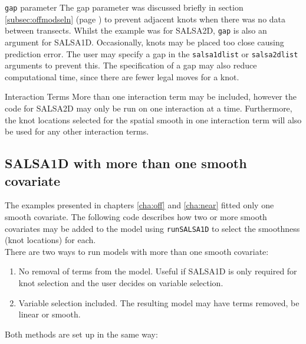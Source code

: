 \begin{block}{{\tt gap} parameter}
The gap parameter was discussed briefly in section \ref{subsec:offmodseln} (page \pageref{gappage}) to prevent adjacent knots when there was no data between transects.  Whilst the example was for SALSA2D, {\tt gap} is also an argument for SALSA1D.  Occasionally, knots may be placed too close causing prediction error.  The user may specify a gap in the {\tt salsa1dlist} or {\tt salsa2dlist} arguments to prevent this.  The specification of a gap may also reduce computational time, since there are fewer legal moves for a knot.
\end{block}

\begin{block}{Interaction Terms}
More than one interaction term may be included, however the code for SALSA2D may only be run on one interaction at a time.  Furthermore, the knot locations selected for the spatial smooth in one interaction term will also be used for any other interaction terms.
\end{block}
\subsection{SALSA1D with more than one smooth covariate}

The examples presented in chapters \ref{cha:off} and \ref{cha:near} fitted only one smooth covariate.  The following code describes how two or more smooth covariates may be added to the model using {\tt runSALSA1D} to select the smoothness (knot locations) for each.\\

\noindent There are two ways to run models with more than one smooth covariate:

\begin{enumerate}
\item No removal of terms from the model.  Useful if SALSA1D is only required for knot selection and the user decides on variable selection.
\item Variable selection included.  The resulting model may have terms removed, be linear or smooth.
\end{enumerate}

\noindent Both methods are set up in the same way:

